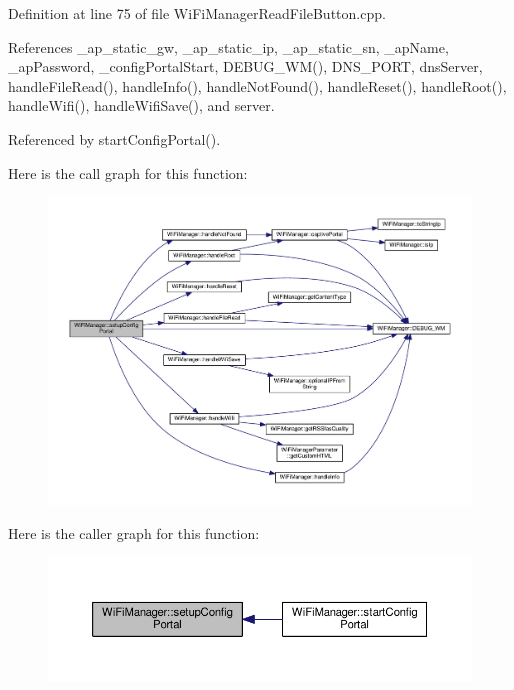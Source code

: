 Definition at line 75 of file Wi\+Fi\+Manager\+Read\+File\+Button.\+cpp.



References \+\_\+ap\+\_\+static\+\_\+gw, \+\_\+ap\+\_\+static\+\_\+ip, \+\_\+ap\+\_\+static\+\_\+sn, \+\_\+ap\+Name, \+\_\+ap\+Password, \+\_\+config\+Portal\+Start, D\+E\+B\+U\+G\+\_\+\+W\+M(), D\+N\+S\+\_\+\+P\+O\+RT, dns\+Server, handle\+File\+Read(), handle\+Info(), handle\+Not\+Found(), handle\+Reset(), handle\+Root(), handle\+Wifi(), handle\+Wifi\+Save(), and server.



Referenced by start\+Config\+Portal().

Here is the call graph for this function\+:
\nopagebreak
\begin{figure}[H]
\begin{center}
\leavevmode
\includegraphics[width=350pt]{d4/dc8/class_wi_fi_manager_a1743325d0dd86d011df96b22d2a0ddd6_cgraph}
\end{center}
\end{figure}
Here is the caller graph for this function\+:
\nopagebreak
\begin{figure}[H]
\begin{center}
\leavevmode
\includegraphics[width=350pt]{d4/dc8/class_wi_fi_manager_a1743325d0dd86d011df96b22d2a0ddd6_icgraph}
\end{center}
\end{figure}
\mbox{\label{class_wi_fi_manager_abcc403fc26a47f7a111d1271f1d0869e}} 
